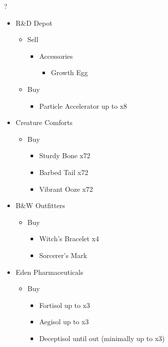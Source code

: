 \begin{shop}{?}
	\begin{itemize}
		\item R\&D Depot
			\begin{itemize}
				\item Sell
					\begin{itemize}
						\item Accessories
							\begin{itemize}
								\item Growth Egg
							\end{itemize}
					\end{itemize}
				\item Buy
					\begin{itemize}
						\item Particle Accelerator up to x8
					\end{itemize}
			\end{itemize}
		\item Creature Comforts
			\begin{itemize}
				\item Buy
					\begin{itemize}
						\item Sturdy Bone x72
						\item Barbed Tail x72
						\item Vibrant Ooze x72
					\end{itemize}
			\end{itemize}
		\item B\&W Outfitters
			\begin{itemize}
				\item Buy
					\begin{itemize}
						\item Witch's Bracelet x4
						\item Sorcerer's Mark
					\end{itemize}
			\end{itemize}
		\item Eden Pharmaceuticals
			\begin{itemize}
				\item Buy
					\begin{itemize}
						\item Fortisol up to x3
						\item Aegisol up to x3
						\item Deceptisol until out (minimally up to x3)
					\end{itemize}
			\end{itemize}						
	\end{itemize}
\end{shop}

